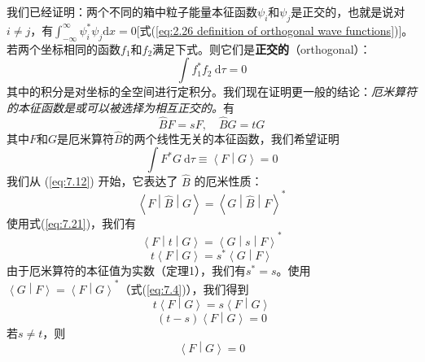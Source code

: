     我们已经证明：两个不同的箱中粒子能量本征函数$\psi_i$和$\psi_j$是正交的，也就是说对$i \neq j$，有$\int_{-\infty}^{\infty}\psi_i^{\ast}\psi_j \mathrm{d}x = 0$[式(\ref{eq:2.26 definition of orthogonal wave functions})]。若两个坐标相同的函数$f_1$和$f_2$满足下式。则它们是\textbf{正交的}（orthogonal）：
    \begin{equation}
        \boxed{
            \int f_1^{\ast} f_2 \:\mathrm{d}\tau = 0
        }
        \label{eq:7.20}
    \end{equation}
    其中的积分是对坐标的全空间进行定积分。我们现在证明更一般的结论：\textit{厄米算符的本征函数是或可以被选择为相互正交的。}有
    \begin{equation}
        \hat{B}F = sF, \quad \hat{B}G = tG
        \label{eq:7.21}
    \end{equation}
    其中$F$和$G$是厄米算符$\hat{B}$的两个线性无关的本征函数，我们希望证明
    \begin{equation*}
        \int F^{\ast} G \:\mathrm{d}\tau \equiv \left\langle F \middle| G \right\rangle = 0
    \end{equation*}
    我们从 (\ref{eq:7.12}) 开始，它表达了 $\hat{B}$ 的厄米性质：
    \begin{equation*}
        \left\langle F \middle| \hat{B} \middle| G \right\rangle = \left\langle G \middle| \hat{B} \middle| F \right\rangle^{\ast}
    \end{equation*}
    使用式(\ref{eq:7.21})，我们有
    \begin{equation*}
        \left\langle F \middle| t \middle| G \right\rangle = \left\langle G \middle| s \middle| F \right\rangle^{\ast}
    \end{equation*}
    \begin{equation*}
        t \left\langle F \middle| G \right\rangle = s^{\ast} \left\langle G \middle| F \right\rangle
    \end{equation*}
    由于厄米算符的本征值为实数（定理1），我们有$s^{\ast} = s$。使用$\left\langle G \middle| F \right\rangle = \left\langle F \middle| G \right\rangle^{\ast}$（式(\ref{eq:7.4})），我们得到
    \begin{equation*}
        t \left\langle F \middle| G \right\rangle = s \left\langle F \middle| G \right\rangle
    \end{equation*}
    \begin{equation*}
        \left(t - s\right) \left\langle F \middle| G \right\rangle = 0
    \end{equation*}
    若$s \neq t$，则
    \begin{equation}
        \left\langle F \middle| G \right\rangle = 0
        \label{eq:7.22}
    \end{equation}

